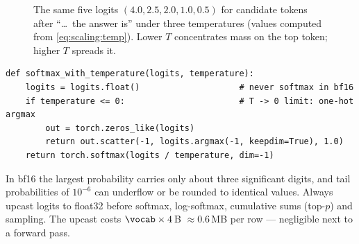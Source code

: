 \begin{figure}[t]
\centering
{}
\caption{The same five logits $(4.0, 2.5, 2.0, 1.0, 0.5)$ for candidate tokens after
``\dots\ the answer is'' under three temperatures (values computed from \cref{eq:scaling:temp}).
Lower $T$ concentrates mass on the top token; higher $T$ spreads it.}
\label{fig:scaling:tempbars}
\end{figure}

\begin{lstlisting}[caption={Temperature-scaled softmax (Lab 15, Task 1).},label={lst:scaling:temp}]
def softmax_with_temperature(logits, temperature):
    logits = logits.float()                    # never softmax in bf16
    if temperature <= 0:                       # T -> 0 limit: one-hot argmax
        out = torch.zeros_like(logits)
        return out.scatter(-1, logits.argmax(-1, keepdim=True), 1.0)
    return torch.softmax(logits / temperature, dim=-1)
\end{lstlisting}

\begin{pitfall}
In bf16 the largest probability carries only about three significant digits, and tail probabilities
of $10^{-6}$ can underflow or be rounded to identical values. Always upcast logits to float32
before softmax, log-softmax, cumulative sums (top-$p$) and sampling. The upcast costs
$\vocab \times 4$\,B $\approx 0.6$\,MB per row --- negligible next to a forward pass.
\end{pitfall}

